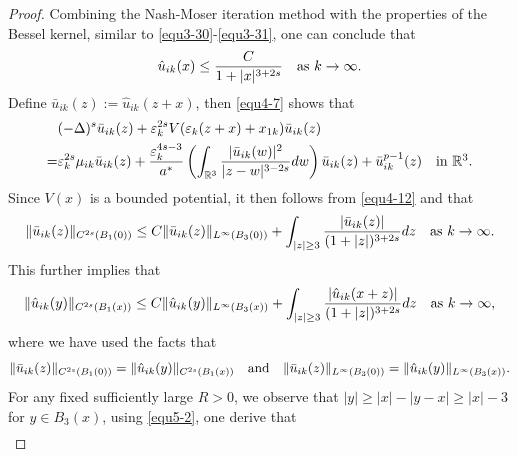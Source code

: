 \documentclass[reqno, 11pt]{amsart} %
\numberwithin{equation}{section}
\begin{document}
	\begin{proof}
		Combining the Nash-Moser iteration method with the properties of the Bessel kernel, similar to \eqref{equ3-30}-\eqref{equ3-31}, one can conclude that
		\begin{equation}\label{equ5-2}
			\hat{u}_{ik}(x)\leq\frac{C}{1+|x|^{3+2s}}\quad \hbox{as $k\rightarrow\infty$}.
		\end{equation}
		Define $\bar{u}_{ik}(z):=\hat{u}_{ik}(z+x)$, then \eqref{equ4-7} shows that
		\begin{equation*}
			\begin{split}
				&(-\Delta)^{s}\bar{u}_{ik}(z)+\varepsilon_{k}^{2s}V(\varepsilon_{k}(z+x)+x_{1k})\bar{u}_{ik}(z)\\
				=&\varepsilon_{k}^{2s}\mu_{ik}\bar{u}_{ik}(z)+\frac{\varepsilon_{k}^{4s-3}}{a^{\ast}}\left(\int_{\mathbb{R}^{3}}\frac{|\bar{u}_{ik}(w)|^{2}}{|z-w|^{3-2s}}dw\right)\bar{u}_{ik}(z)+\bar{u}_{ik}^{p-1}(z) \quad \hbox{in $\mathbb{R}^3$}.
			\end{split}
		\end{equation*}
		Since $V(x)$ is a bounded potential, it then follows from \eqref{equ4-12} and \cite[Theorem 12.2.4]{C} that
		\begin{equation*}
			\|\bar{u}_{ik}(z)\|_{C^{2s}(B_{1}(0))}\leq C	\|\bar{u}_{ik}(z)\|_{L^{\infty}(B_{3}(0))}+\int_{|z|\geq3}\frac{|\bar{u}_{ik}(z)|}{(1+|z|)^{3+2s}}dz\quad \hbox{as $k\rightarrow\infty$}.
		\end{equation*}
		This further implies that
		\begin{equation}\label{equ5-3}
			\|\hat{u}_{ik}(y)\|_{C^{2s}(B_{1}(x))}\leq C	\|\hat{u}_{ik}(y)\|_{L^{\infty}(B_{3}(x))}+\int_{|z|\geq3}\frac{|\hat{u}_{ik}(x+z)|}{(1+|z|)^{3+2s}}dz\quad \hbox{as $k\rightarrow\infty$},
		\end{equation}
		where we have used the facts that
		\begin{equation*}
			\begin{split}
				\|\bar{u}_{ik}(z)\|_{C^{2s}(B_{1}(0))}=	\|\hat{u}_{ik}(y)\|_{C^{2s}(B_{1}(x))}\quad \hbox{and}\quad 		\|\bar{u}_{ik}(z)\|_{L^{\infty}(B_{3}(0))}=\|\hat{u}_{ik}(y)\|_{L^{\infty}(B_{3}(x))}.
			\end{split}
		\end{equation*}		
		For any fixed sufficiently large $R>0$, we observe that $|y|\geq|x|-|y-x|\geq|x|-3$ for $y\in B_{3}(x)$, using \eqref{equ5-2}, one derive that
		\begin{equation}\label{equ5-4}
			\begin{split}

\end{split}
\end{equation}
\end{proof}
\end{document}
